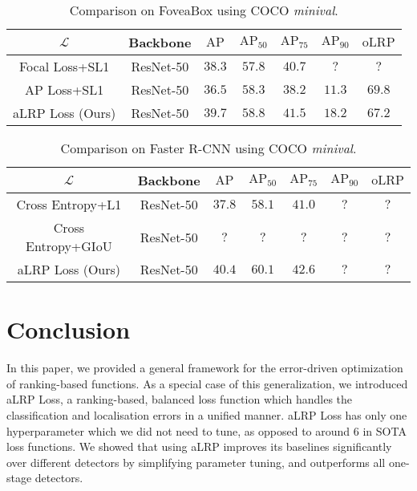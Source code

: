 \documentclass{article}
\begin{document}
{\begin{table}[]
    \centering
    \caption{Comparison on FoveaBox using COCO \textit{minival}.}
    \label{tab:anchorfree}
    \begin{tabular}{|c|c|c|c|c|c|c|} \hline
    $\mathcal{L}$&Backbone&$\mathrm{AP}$&$\mathrm{AP_{50}}$&$\mathrm{AP_{75}}$&$\mathrm{AP_{90}}$&$\mathrm{oLRP}$ \\ \hline
    Focal Loss+SL1&ResNet-50&$38.3$&$57.8$&$40.7$&$?$&$?$\\ \hline
    AP Loss+SL1&ResNet-50&$36.5$&$58.3$&$38.2$&$11.3$&$69.8$\\ \hline
    aLRP Loss (Ours)&ResNet-50&$\mathbf{39.7}$&$\mathbf{58.8}$&$\mathbf{41.5}$&$\mathbf{18.2}$&$\mathbf{67.2}$\\ \hline
    \end{tabular}
\end{table}

\begin{table}[]
    \centering
    \caption{Comparison on Faster R-CNN using COCO \textit{minival}.}
    \label{tab:twostage}
    \begin{tabular}{|c|c|c|c|c|c|c|} \hline
    $\mathcal{L}$&Backbone&$\mathrm{AP}$&$\mathrm{AP_{50}}$&$\mathrm{AP_{75}}$&$\mathrm{AP_{90}}$&$\mathrm{oLRP}$ \\ \hline
    Cross Entropy+L1&ResNet-50&$37.8$&$58.1$&$41.0$&$?$&$?$\\ \hline
    Cross Entropy+GIoU&ResNet-50&$?$&$?$&$?$&$?$&$?$\\ \hline
aLRP Loss (Ours)&ResNet-50&$40.4$&$60.1$&$42.6$&$?$&$?$\\ \hline
    \end{tabular}
\end{table}
} \section{Conclusion}
\label{sec:Conclusion}

In this paper, we provided a general framework for the error-driven optimization of ranking-based functions. As a special case of this generalization, we introduced aLRP Loss, a  ranking-based, balanced loss function which handles the classification and localisation errors in a unified manner. aLRP Loss has only one hyperparameter which we did not need to tune, as opposed to around 6 in SOTA loss functions.  We showed that using aLRP improves its baselines significantly over different detectors by simplifying parameter tuning, and outperforms all one-stage detectors. 
\end{document}
